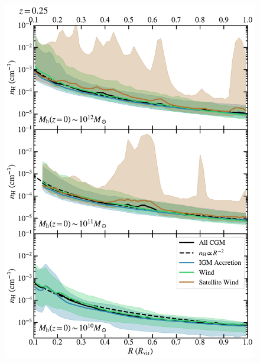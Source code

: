 \documentclass[fleqn,usenatbib]{mnras}
\begin{document}
\begin{figure}
\centering
\begin{minipage}{0.495\textwidth}
\centering
\includegraphics[width=\textwidth]{figures/CGM_den_profile_snum465.pdf}
\end{minipage} \hfill
\begin{minipage}{0.495\textwidth}
\centering

\end{minipage}
\end{figure}
\end{document}
